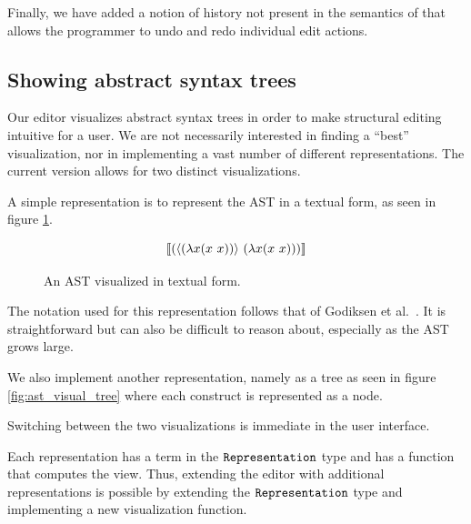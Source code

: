 Finally, we have added a notion of history not present in the
semantics of \cite{10.1145/3441296.3441393} that allows the programmer
to undo and redo individual edit actions. 

\subsection{Showing abstract syntax trees}

Our editor visualizes abstract syntax trees in order to make
structural editing intuitive for a user.  We are not necessarily
interested in finding a ``best'' visualization, nor in implementing a
vast number of different representations. The current version allows
for two distinct visualizations.

A simple representation is to represent the AST in a textual form,
as seen in figure \ref{fig:ast-in-text-form}.

\begin{figure}[H]
  \Large
  \begin{equation*}
    \llbracket (\langle (\lambda{x}{(x~x)}) \rangle~(\lambda{x}{(x~x)})) \rrbracket
  \end{equation*}
  \caption{An AST visualized in textual form.}
  \label{fig:ast-in-text-form}
\end{figure}

The notation used for this representation follows that of Godiksen
et al.~\pepm. It is straightforward but can also be
difficult to reason about, especially as the AST grows large.

We also implement another representation, namely as a tree as seen in
figure \ref{fig:ast_visual_tree} where each construct is represented as a node.

Switching between the two visualizations is immediate in the user interface.

Each representation has a term in the $\texttt{Representation}$ type and has a
function that computes the view. Thus, extending the editor with additional
representations is possible by extending the $\texttt{Representation}$ type and
implementing a new visualization function.

